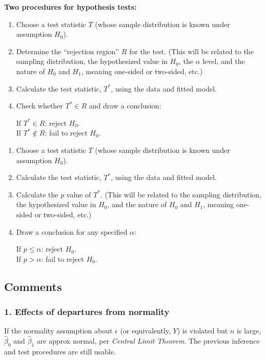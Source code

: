\documentclass[12pt]{article}
\begin{document}
\bigskip
\textbf{Two procedures for hypothesis tests:}
\bigskip

\begin{enumerate}
\item Choose a test statistic $T$ (whose sample distribution is known
under assumption $H_0$).
\item Determine the ``rejection region'' $R$ for the test.
(This will be related to the sampling distribution, the hypothesized
value in $H_0$, the $\alpha$ level, and the nature of $H_0$ and $H_1$,
meaning one-sided or two-sided, etc.)
\item Calculate the test statistic, $T^*$, using the data and fitted
model.
\item Check whether $T^* \in R$ and draw a conclusion:

If $T^* \in R$: reject $H_0$.\\
If $T^* \notin R$: fail to reject $H_0$.
\end{enumerate}

\begin{enumerate}
\item Choose a test statistic $T$ (whose sample distribution is known
under assumption $H_0$).
\item Calculate the test statistic, $T^*$, using the data and fitted
model.
\item Calculate the $p$ value of $T^*$.
(This will be related to the sampling distribution, the hypothesized
value in $H_0$, and the nature of $H_0$ and $H_1$,
meaning one-sided or two-sided, etc.)
\item Draw a conclusion for any specified $\alpha$:

If $p \le \alpha$: reject $H_0$.\\
If $p > \alpha$: fail to reject $H_0$.
\end{enumerate}


\subsection*{Comments}

\subsubsection{1. Effects of departures from normality}

If the normality assumption about $\epsilon$ (or equivalently, $Y$)
is violated but $n$ is large, $\hat{\beta}_0$ and $\hat{\beta}_1$ are approx normal, per
\emph{Central Limit Theorem}.
The previous inference and test procedures are still usable.
\end{document}
